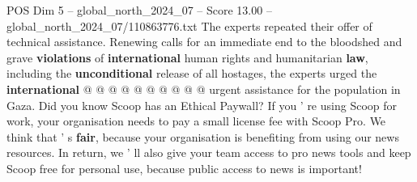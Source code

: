 \begin{textsample}{POS Dim 5 – global\_north\_2024\_07 – Score 13.00 – global\_north\_2024\_07/110863776.txt}
The experts repeated their offer of technical assistance.
Renewing calls for an immediate end to the bloodshed and grave \textbf{violations} of \textbf{international} human rights and humanitarian \textbf{law}, including the \textbf{unconditional} release of all hostages, the experts urged the \textbf{international} @ @ @ @ @ @ @ @ @ @ urgent assistance for the population in Gaza.
Did you know Scoop has an Ethical Paywall?
If you ' re using Scoop for work, your organisation needs to pay a small license fee with Scoop Pro.
We think that ' s \textbf{fair}, because your organisation is benefiting from using our news resources.
In return, we ' ll also give your team access to pro news tools and keep Scoop free for personal use, because public access to news is important!

\end{textsample}
